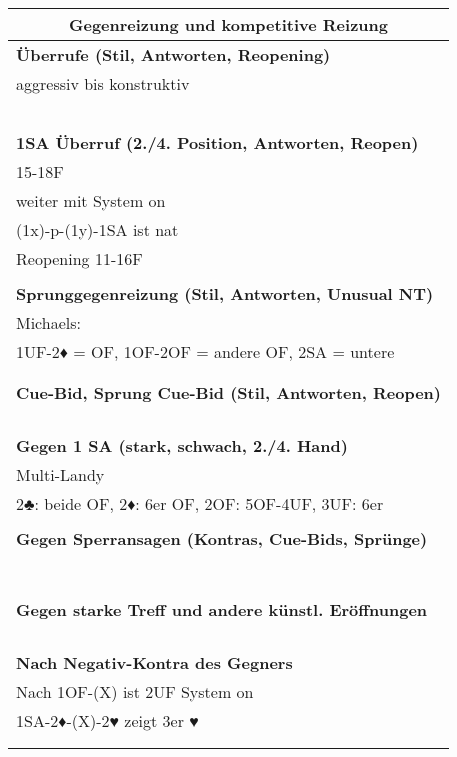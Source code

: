 \documentclass{article}
\begin{document}
\begin{multicols}{3}
\raggedcolumns

\begin{tabularx}{\columnwidth}{|X|}
\hline \multicolumn{1}{c}{\bf \large Gegenreizung und kompetitive Reizung} \\
\hline \bf Überrufe (Stil, Antworten, Reopening) \\
 aggressiv bis konstruktiv \\
\\
\\
\\
\\
\\
\hline \bf 1SA Überruf (2./4. Position, Antworten, Reopen) \\
 15-18F \\
 weiter mit System on \\
 (1x)-p-(1y)-1SA ist nat \\
 Reopening 11-16F\\
\\
\hline \bf Sprunggegenreizung (Stil, Antworten, Unusual NT) \\
 Michaels: \\
 1UF-2♦ = OF, 1OF-2OF = andere OF, 2SA = untere \\
\\
\\
\hline \bf Cue-Bid, Sprung Cue-Bid (Stil, Antworten, Reopen) \\
\\
\\
\\
\\
\hline \bf Gegen 1 SA (stark, schwach, 2./4. Hand) \\
 Multi-Landy \\
 2♣: beide OF, 2♦: 6er OF, 2OF: 5OF-4UF, 3UF: 6er \\
\\
\hline \bf Gegen Sperransagen (Kontras, Cue-Bids, Sprünge) \\
\\
\\
\\
\\
\\
\\
\\
\hline \bf Gegen starke Treff und andere künstl. Eröffnungen \\
\\
\\
\\
\\
\hline \bf Nach Negativ-Kontra des Gegners \\
 Nach 1OF-(X) ist 2UF System on \\
 1SA-2♦-(X)-2♥ zeigt 3er ♥ \\
\\
\\
\hline \end{tabularx}


\end{multicols}
\end{document}
